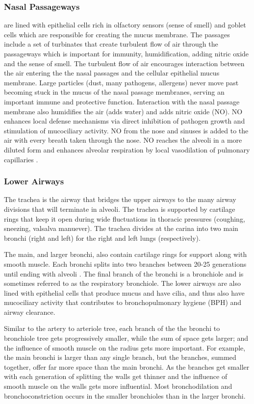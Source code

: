 \subsubsection{Nasal Passageways} are lined with epithelial cells rich in olfactory sensors (sense of smell) and goblet cells which are responsible for creating the mucus membrane. The passages include a set of turbinates that create turbulent flow of air through the passageways which is important for immunity, humidification, adding nitric oxide and the sense of smell. The turbulent flow of air encourages interaction between the air entering the the nasal passages and the cellular epithelial mucus membrane. Large particles (dust, many pathogens, allergens) never move past becoming stuck in the mucus of the nasal passage membranes, serving an important immune and protective function. Interaction with the nasal passage membrane also humidifies the air (adds water) and adds nitric oxide (NO). NO enhances local defense mechanisms via direct inhibition of pathogen growth and stimulation of mucociliary activity. NO from the nose and sinuses is added to the air with every breath taken through the nose. NO reaches the alveoli in a more diluted form and enhances alveolar respiration by local vasodilation of pulmonary capillaries \cite{tornberg_nasal_2002, lundberg_nitric_2008}.

\subsubsection{Lower Airways}
The trachea is the airway that bridges the upper airways to the many airway divisions that will terminate in alveoli. The trachea is supported by cartilage rings that keep it open during wide fluctuations in thoracic pressures (coughing, sneezing, valsalva manuever). The trachea divides at the carina into two main bronchi (right and left) for the right and left lungs (respectively). 

The main, and larger bronchi, also contain cartilage rings for support along with smooth muscle. Each bronchi splits into two branches between 20-25 generations until ending with alveoli \cite{hall_guyton_2020}. The final branch of the bronchi is a bronchiole and is sometimes referred to as the respiratory bronchiole. The lower airways are also lined with epithelial cells that produce mucus and have cilia, and thus also have mucociliary activity that contributes to bronchopulmonary hygiene (BPH) and airway clearance. 

Similar to the artery to arteriole tree, each branch of the the bronchi to bronchiole tree gets progressively smaller, while the sum of space gets larger; and the influence of smooth muscle on the radius gets more important. For example, the main bronchi is larger than any single branch, but the branches, summed together, offer far more space than the main bronchi. As the branches get smaller with each generation of splitting the walls get thinner and the influence of smooth muscle on the walls gets more influential. Most bronchodilation and bronchoconstriction occurs in the smaller bronchioles than in the larger bronchi.


